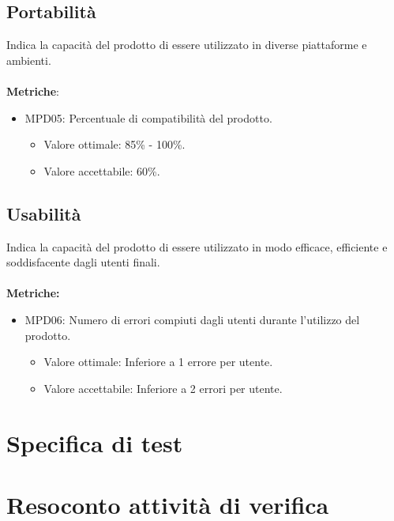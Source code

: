 \documentclass[12pt]{article}
\begin{document}
\subsection{Portabilità}
	Indica la capacità del prodotto di essere utilizzato in diverse piattaforme e ambienti.
	\\\\
	\textbf{Metriche}:
		  \begin{itemize}
			\item MPD05: Percentuale di compatibilità del prodotto.
			\begin{itemize}	
				\item Valore ottimale: 85\% - 100\%.
				\item Valore accettabile: 60\%.
			\end{itemize}
		\end{itemize}


\subsection{Usabilità}
	Indica la capacità del prodotto di essere utilizzato in modo efficace, efficiente e soddisfacente dagli utenti finali.
	\\\\
	\textbf{Metriche:}
		  \begin{itemize}
			\item MPD06: Numero di errori compiuti dagli utenti durante l'utilizzo del prodotto.
			\begin{itemize}	
				\item Valore ottimale: Inferiore a 1 errore per utente.
				\item Valore accettabile: Inferiore a 2 errori per utente.
			\end{itemize}
		\end{itemize}
		  


\section{Specifica di test}
\section {Resoconto attività di verifica}
\end{document}
